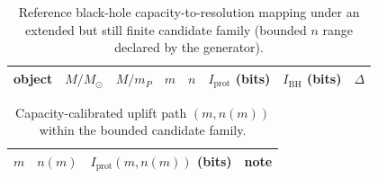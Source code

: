 \begin{table}[t]
\centering
\tiny
\setlength{\tabcolsep}{4pt}
\renewcommand{\arraystretch}{1.15}
\begin{tabular}{p{} r r r r r r r}
\toprule
object & $M/M_\odot$ & $M/m_P$ & $m$ & $n$ & $I_{\mathrm{prot}}$ (bits) & $I_{\mathrm{BH}}$ (bits) & $\Delta$ \\
\midrule
%
\end{tabular}
\caption{Reference black-hole capacity-to-resolution mapping under an extended but still finite candidate family (bounded $n$ range declared by the generator).}
\label{tab:bh_planck_capacity_known}
\end{table}

\begin{table}[t]
\centering
\tiny
\setlength{\tabcolsep}{3pt}
\renewcommand{\arraystretch}{1.1}
\begin{tabular}{r r r p{}}
\toprule
$m$ & $n(m)$ & $I_{\mathrm{prot}}(m,n(m))$ (bits) & note \\
\midrule
%
\end{tabular}
\caption{Capacity-calibrated uplift path $(m,n(m))$ within the bounded candidate family.}
\label{tab:bh_capacity_calibrated_uplift_path}
\end{table}

